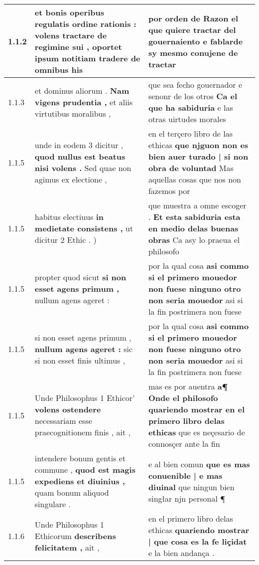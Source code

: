\begin{tabular}{|p{1cm}|p{6.5cm}|p{6.5cm}|}

\hline
1.1.2 & et bonis operibus regulatis ordine rationis : \textbf{ volens tractare de regimine sui , } oportet ipsum notitiam tradere de omnibus his & por orden de Razon \textbf{ el que quiere tractar del gouernaiento } e fablarde sy mesmo conujene de tractar \\\hline
1.1.3 & et dominus aliorum . \textbf{ Nam vigens prudentia , } et aliis virtutibus moralibus , & que sea fecho gouernador e senonr de los otros \textbf{ Ca el que ha sabiduria } e las otras uirtudes morales \\\hline
1.1.5 & unde in eodem 3 dicitur , \textbf{ quod nullus est beatus nisi volens . } Sed quae non agimus ex electione , & en el terçero libro de las ethicas \textbf{ que njguon non es bien auer turado | si non obra de voluntad } Mas aquellas cosas que nos non fazemos por \\\hline
1.1.5 & habitus electiuus \textbf{ in medietate consistens , } ut dicitur 2 Ethic . ) & que muestra a omne escoger . \textbf{ Et esta sabiduria esta en medio delas buenas obras } Ca asy lo praeua el philosofo \\\hline
1.1.5 & propter quod sicut \textbf{ si non esset agens primum , } nullum agens ageret : & por la qual cosa \textbf{ asi commo si el primero mouedor non fuese ninguno otro non seria mouedor } asi si la fin postrimera non fuese \\\hline
1.1.5 & si non esset agens primum , \textbf{ nullum agens ageret : } sic si non esset finis ultimus , & por la qual cosa \textbf{ asi commo si el primero mouedor non fuese ninguno otro non seria mouedor } asi si la fin postrimera non fuese \\\hline
1.1.5 & Unde Philosophus 1 Ethicor’ \textbf{ volens ostendere } necessariam esse praecognitionem finis , ait , & mas es por auentra \textbf{ a¶ Onde el philosofo quariendo mostrar en el primero libro delas ethicas } que es neçesario de connosçer ante la fin \\\hline
1.1.5 & intendere bonum gentis et commune , \textbf{ quod est magis expediens et diuinius , } quam bonum aliquod singulare . & e al bien comun \textbf{ que es mas conuenible | e mas diuinal } que ningun bien singłar njn personal ¶ \\\hline
1.1.6 & Unde Philosophus 1 Ethicorum \textbf{ describens felicitatem , } ait , & en el primero libro delas ethicas \textbf{ quariendo mostrar | que cosa es la fe liçidat } e la bien andança . \\\hline

\end{tabular}

